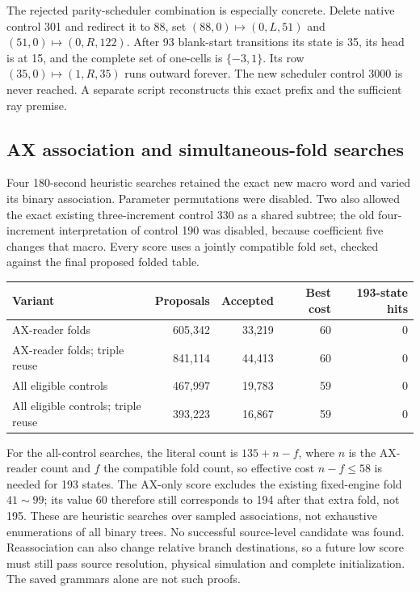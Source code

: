 The rejected parity-scheduler combination is especially concrete. Delete
native control 301 and redirect it to 88, set
$(88,0)\mapsto(0,L,51)$ and $(51,0)\mapsto(0,R,122)$.
After 93 blank-start transitions its state is 35, its head is at 15, and
the complete set of one-cells is $\{-3,1\}$. Its row
$(35,0)\mapsto(1,R,35)$ runs outward forever. The new scheduler control
3000 is never reached. A separate script reconstructs this exact prefix
and the sufficient ray premise.

\subsection{AX association and simultaneous-fold searches}

Four 180-second heuristic searches retained the exact new macro word and
varied its binary association. Parameter permutations were disabled. Two
also allowed the exact existing three-increment control 330 as a shared
subtree; the old four-increment interpretation of control 190 was disabled,
because coefficient five changes that macro. Every score uses a jointly
compatible fold set, checked against the final proposed folded table.

\begin{center}\small
\begin{tabular}{@{}lrrrr@{}}
\toprule Variant & Proposals & Accepted & Best cost & 193-state hits\\\midrule
AX-reader folds &605,342&33,219&60&0\\
AX-reader folds; triple reuse &841,114&44,413&60&0\\
All eligible controls &467,997&19,783&59&0\\
All eligible controls; triple reuse &393,223&16,867&59&0\\
\bottomrule
\end{tabular}
\end{center}

For the all-control searches, the literal count is
$135+n-f$, where $n$ is the AX-reader count and $f$ the compatible fold
count, so effective cost $n-f\le58$ is needed for 193 states. The AX-only
score excludes the existing fixed-engine fold $41\sim99$; its value 60
therefore still corresponds to 194 after that extra fold, not 195.
These are heuristic searches over sampled associations, not exhaustive
enumerations of all binary trees. No successful source-level candidate was
found. Reassociation can also change relative branch destinations, so a
future low score must still pass source resolution, physical simulation
and complete initialization. The saved grammars alone are not such proofs.
